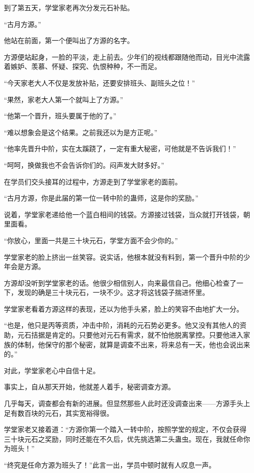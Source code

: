 \begin{this_body}
到了第五天，学堂家老再次分发元石补贴。

“古月方源。”

他站在前面，第一个便叫出了方源的名字。

方源便站起身，一脸的平淡，走上前去。少年们的视线都跟随他而动，目光中流露着嫉妒、羡慕、怀疑、探究、仇恨种种，不一而足。

“今天家老大人不仅是发放补贴，还要安排班头、副班头之位！”

“果然，家老大人第一个就叫上了方源。”

“他第一个晋升，班头要属于他的了。”

“难以想象会是这个结果。之前我还以为是方正呢。”

“他率先晋升中阶，实在太蹊跷了，一定有重大秘密，可他就是不告诉我们！”

“呵呵，换做我也不会告诉你们的。闷声发大财多好。”

在学员们交头接耳的过程中，方源走到了学堂家老的面前。

“古月方源，你是此届的第一位一转中阶的蛊师，这是你的奖励。”

说着，学堂家老递给他一个蓝白相间的钱袋。方源接过钱袋，当众就打开钱袋，朝里面看。

“你放心，里面一共是三十块元石，学堂方面不会少你的。”

学堂家老的脸上挤出一丝笑容。说实话，他根本就没有料到，第一个晋升中阶的少年会是方源。

方源却没听到学堂家老的话。他很少相信别人，向来最信自己。他细心检查了一下，发现的确是三十块元石，一块不少。这才将这钱袋子揣进怀里。

学堂家老看着方源这样的表现，还以为他手头紧，脸上的笑容不由地扩大一分。

“也是，他只是丙等资质，冲击中阶，消耗的元石势必更多。他又没有其他人的资助，元石拮据是肯定的。只要他对元石有需求，就不怕他脱离掌控。只要他进入家族的体制，他保守的那个秘密，就算是调查不出来，将来总有一天，他也会说出来的。”

对此，学堂家老心中自信十足。

事实上，自从那天开始，他就差人着手，秘密调查方源。

几乎每天，调查都会有新的进展。但显然那些人此时还没调查出来——方源手头上足有数百块的元石，其实宽裕得很。

学堂家老又接着道：“方源你第一个踏入一转中阶，按照学堂的规定，不仅会获得三十块元石之奖励，同时还能在不久后，优先挑选第二头蛊虫。现在，我就任命你为班头！”

“终究是任命方源为班头了！”此言一出，学员中顿时就有人叹息一声。


\end{this_body}
